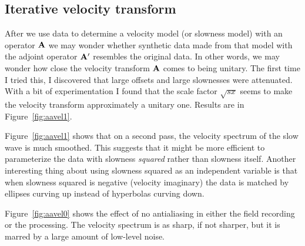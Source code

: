
\subsection{Iterative velocity transform}
After we use data to determine a velocity model
(or slowness model)
with an operator $\bold A$
we may wonder whether synthetic data made from that model
with the adjoint operator $\bold A'$ resembles the original data.
In other words,
we may wonder how close the velocity transform $\bold A$
comes to being unitary.
The first time I tried this, I discovered that
large offsets and large slownesses were attenuated.
With a bit of experimentation I found that the scale factor $\sqrt{sx}$
seems to make the velocity transform approximately a unitary one.
Results are in Figure~\ref{fig:aavel1}. 

Figure~\ref{fig:aavel1} shows that on a second pass,
the velocity spectrum of the slow wave is much smoothed.
This suggests that it might be more efficient to parameterize
the data with slowness {\em  squared} rather than slowness itself.
Another interesting thing about using slowness squared as 
an independent variable is that when slowness squared is negative
(velocity imaginary)
the data is matched by ellipses curving up
instead of hyperbolas curving down.

\par
Figure~\ref{fig:aavel0} shows the effect of no antialiasing
in either the field recording or the processing.
The velocity spectrum is as sharp, if not sharper,
but it is marred by a large amount of low-level noise.

